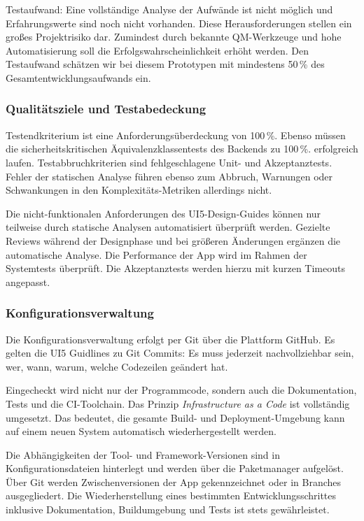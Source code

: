 Testaufwand: Eine vollständige Analyse der Aufwände ist nicht möglich und Erfahrungswerte sind noch nicht vorhanden. Diese Herausforderungen stellen ein großes Projektrisiko dar. Zumindest durch bekannte QM-Werkzeuge und hohe Automatisierung soll die Erfolgswahrscheinlichkeit erhöht werden. Den Testaufwand schätzen wir bei diesem Prototypen mit mindestens 50\,\% des Gesamtentwicklungsaufwands ein.

\subsubsection{Qualitätsziele und Testabedeckung}
Testendkriterium ist eine Anforderungsüberdeckung von 100\,\%. Ebenso müssen die sicherheitskritischen Äquivalenzklassentests des Backends zu 100\,\%. erfolgreich laufen. Testabbruchkriterien sind fehlgeschlagene Unit- und Akzeptanztests. Fehler der statischen Analyse führen ebenso zum Abbruch, Warnungen oder Schwankungen in den Komplexitäts-Metriken allerdings nicht.

Die nicht-funktionalen Anforderungen des UI5-Design-Guides können nur teilweise durch statische Analysen automatisiert überprüft werden. Gezielte Reviews während der Designphase und bei größeren Änderungen ergänzen die automatische Analyse. Die Performance der App wird im Rahmen der Systemtests überprüft. Die Akzeptanztests werden hierzu mit kurzen Timeouts angepasst.

\subsubsection{Konfigurationsverwaltung}
Die Konfigurationsverwaltung erfolgt per Git über die Plattform GitHub. Es gelten die UI5 Guidlines zu Git Commits: Es muss jederzeit nachvollziehbar sein, wer, wann, warum, welche Codezeilen geändert hat.

Eingecheckt wird nicht nur der Programmcode, sondern auch die Dokumentation, Tests und die CI-Toolchain. Das Prinzip \textit{Infrastructure as a Code} ist vollständig umgesetzt. Das bedeutet, die gesamte Build- und Deployment-Umgebung kann auf einem neuen System automatisch wiederhergestellt werden. 

Die Abhängigkeiten der Tool- und Framework-Versionen sind in Konfigurationsdateien hinterlegt und werden über die Paketmanager aufgelöst. Über Git werden Zwischenversionen der App gekennzeichnet oder in Branches ausgegliedert. Die Wiederherstellung eines bestimmten Entwicklungsschrittes inklusive Dokumentation, Buildumgebung und Tests ist stets gewährleistet. 

